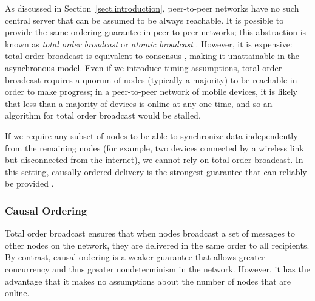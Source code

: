 As discussed in Section~\ref{sect.introduction}, peer-to-peer networks have no such central server
that can be assumed to be always reachable. It is possible to provide the same ordering guarantee in
peer-to-peer networks; this abstraction is known as \emph{total order broadcast} or \emph{atomic
broadcast} \cite{Cachin:2011wt}. However, it is expensive: total order broadcast is equivalent to
consensus \cite{Chandra:1996cp}, making it unattainable in the asynchronous model. Even if we
introduce timing assumptions, total order broadcast requires a quorum of nodes (typically a
majority) to be reachable in order to make progress; in a peer-to-peer network of mobile devices, it
is likely that less than a majority of devices is online at any one time, and so an algorithm for
total order broadcast would be stalled.

If we require any subset of nodes to be able to synchronize data independently from the remaining
nodes (for example, two devices connected by a wireless link but disconnected from the internet), we
cannot rely on total order broadcast. In this setting, causally ordered delivery is the strongest
guarantee that can reliably be provided \cite{Attiya:2015dm}.

\subsubsection{Causal Ordering}

Total order broadcast ensures that when nodes broadcast a set of messages to other nodes on the
network, they are delivered in the same order to all recipients. By contrast, causal ordering is a
weaker guarantee that allows greater concurrency and thus greater nondeterminism in the network.
However, it has the advantage that it makes no assumptions about the number of nodes that are
online.




